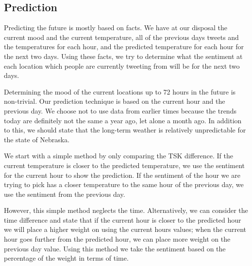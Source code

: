 
\subsection{Prediction}
\label{sec:pred}

Predicting the future is mostly based on facts. We have at our disposal the current mood and the current temperature, all of the previous days tweets and the temperatures for each hour, and the predicted temperature for each hour for the next two days. Using these facts, we try to determine what the sentiment at each location which people are currently tweeting from will be for the next two days.

Determining the mood of the current locations up to 72 hours in the future is non-trivial. Our prediction technique is based on the current hour and the previous day. We choose not to use data from earlier times because the trends today are definitely not the same a year ago, let alone a month ago. In addition to this, we should state that the long-term weather is relatively unpredictable for the state of Nebraska.

We start with a simple method by only comparing the TSK difference. If the current temperature is closer to the predicted temperature, we use the sentiment for the current hour to show the prediction. If the sentiment of the hour we are trying to pick has a closer temperature to the same hour of the previous day, we use the sentiment from the previous day.

However, this simple method neglects the time. Alternatively, we can consider the time difference and state that if the current hour is closer to the predicted hour we will place a higher weight on using the current hours values; when the current hour goes further from the predicted hour, we can place more weight on the previous day value. %
Using this method we take the sentiment based on the percentage of the weight in terms of time.

